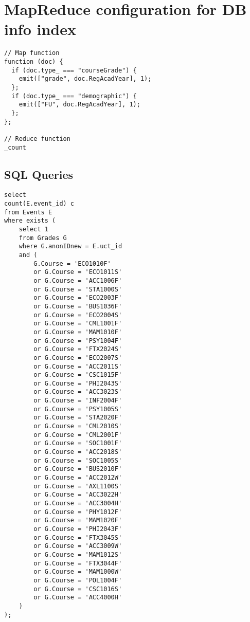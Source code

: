 \section{MapReduce configuration for DB info index}
\label{appendix:dbInfo}
\begin{verbatim}
// Map function
function (doc) {
  if (doc.type_ === "courseGrade") {
    emit(["grade", doc.RegAcadYear], 1);  
  };
  if (doc.type_ === "demographic") {
    emit(["FU", doc.RegAcadYear], 1);
  };
};

// Reduce function
_count
\end{verbatim}













\subsection{SQL Queries}
\label{appendix:sql}




\begin{verbatim}
select
count(E.event_id) c 
from Events E
where exists (
    select 1
    from Grades G
    where G.anonIDnew = E.uct_id
    and (
        G.Course = 'ECO1010F'
        or G.Course = 'ECO1011S'
        or G.Course = 'ACC1006F'
        or G.Course = 'STA1000S'
        or G.Course = 'ECO2003F'
        or G.Course = 'BUS1036F'
        or G.Course = 'ECO2004S'
        or G.Course = 'CML1001F'
        or G.Course = 'MAM1010F'
        or G.Course = 'PSY1004F'
        or G.Course = 'FTX2024S'
        or G.Course = 'ECO2007S'
        or G.Course = 'ACC2011S'
        or G.Course = 'CSC1015F'
        or G.Course = 'PHI2043S'
        or G.Course = 'ACC3023S'
        or G.Course = 'INF2004F'
        or G.Course = 'PSY1005S'
        or G.Course = 'STA2020F'
        or G.Course = 'CML2010S'
        or G.Course = 'CML2001F'
        or G.Course = 'SOC1001F'
        or G.Course = 'ACC2018S'
        or G.Course = 'SOC1005S'
        or G.Course = 'BUS2010F'
        or G.Course = 'ACC2012W'
        or G.Course = 'AXL1100S'
        or G.Course = 'ACC3022H'
        or G.Course = 'ACC3004H'
        or G.Course = 'PHY1012F'
        or G.Course = 'MAM1020F'
        or G.Course = 'PHI2043F'
        or G.Course = 'FTX3045S'
        or G.Course = 'ACC3009W'
        or G.Course = 'MAM1012S'
        or G.Course = 'FTX3044F'
        or G.Course = 'MAM1000W'
        or G.Course = 'POL1004F'
        or G.Course = 'CSC1016S'
        or G.Course = 'ACC4000H'
    )
);
\end{verbatim}